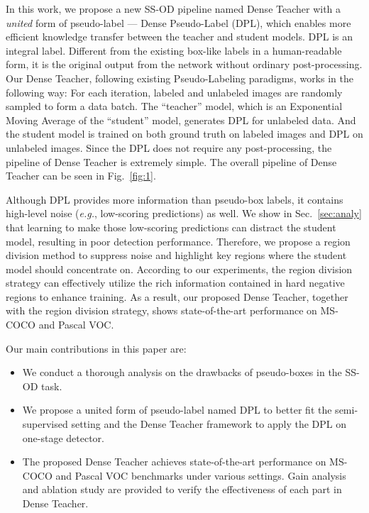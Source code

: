 \documentclass[runningheads]{llncs}
\begin{document}
In this work, we propose a new SS-OD pipeline named Dense Teacher with a \textit{united} form of pseudo-label --- Dense Pseudo-Label (DPL), which enables more efficient knowledge transfer between the teacher and student models. DPL is an integral label. Different from the existing box-like labels in a human-readable form, it is the original output from the network without ordinary post-processing. 
Our Dense Teacher, following existing Pseudo-Labeling paradigms, works in the following way: For each iteration, labeled and unlabeled images are randomly sampled to form a data batch. The ``teacher'' model, which is an Exponential Moving Average of the ``student'' model, generates DPL for unlabeled data. And the student model is trained on both ground truth on labeled images and DPL on unlabeled images. Since the DPL does not require any post-processing, the pipeline of Dense Teacher is extremely simple. The overall pipeline of Dense Teacher can be seen in Fig.~\ref{fig:1}.

Although DPL provides more information than pseudo-box labels, it contains high-level noise (\emph{e.g.}, low-scoring predictions) as well. We show in Sec.~\ref{sec:analy} that learning to make those low-scoring predictions can distract the student model, resulting in poor detection performance. Therefore, we propose a region division method to suppress noise and highlight key regions where the student model should concentrate on. According to our experiments, the region division strategy can effectively utilize the rich information contained in hard negative regions to enhance training. As a result, our proposed Dense Teacher, together with the region division strategy, shows state-of-the-art performance on MS-COCO and Pascal VOC.

Our main contributions in this paper are:
\begin{itemize}
	\item We conduct a thorough analysis on the drawbacks of pseudo-boxes in the SS-OD task.
	\item We propose a united form of pseudo-label named DPL to better fit the semi-supervised setting and the Dense Teacher framework to apply the DPL on one-stage detector.
	\item The proposed Dense Teacher achieves state-of-the-art performance on MS-COCO and Pascal VOC benchmarks under various settings. Gain analysis  and ablation study are provided to verify the effectiveness of each part in Dense Teacher.
\end{itemize}
\end{document}
